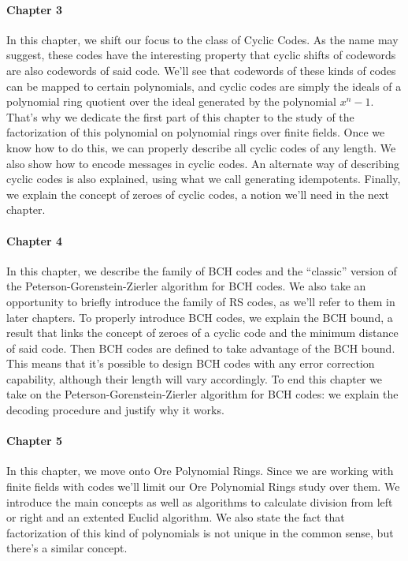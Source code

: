\paragraph{Chapter 3} In this chapter, we shift our focus to the class of Cyclic Codes. 
As the name may suggest, these codes have the interesting property that cyclic shifts of codewords are also codewords of said code.
We'll see that codewords of these kinds of codes can be mapped to certain polynomials, and cyclic codes are simply the ideals of a polynomial ring quotient over the ideal generated by the polynomial \(x^n - 1\).
That's why we dedicate the first part of this chapter to the study of the factorization of this polynomial on polynomial rings over finite fields.
Once we know how to do this, we can properly describe all cyclic codes of any length.
We also show how to encode messages in cyclic codes.
An alternate way of describing cyclic codes is also explained, using what we call generating idempotents.
Finally, we explain the concept of zeroes of cyclic codes, a notion we'll need in the next chapter.

\paragraph{Chapter 4} In this chapter, we describe the family of BCH codes and the ``classic'' version of the Peterson-Gorenstein-Zierler algorithm for BCH codes.
We also take an opportunity to briefly introduce the family of RS codes, as we'll refer to them in later chapters.
To properly introduce BCH codes, we explain the BCH bound, a result that links the concept of zeroes of a cyclic code and the minimum distance of said code.
Then BCH codes are defined to take advantage of the BCH bound.
This means that it's possible to design BCH codes with any error correction capability, although their length will vary accordingly.
To end this chapter we take on the Peterson-Gorenstein-Zierler algorithm for BCH codes: we explain the decoding procedure and justify why it works.

\paragraph{Chapter 5} In this chapter, we move onto Ore Polynomial Rings.
Since we are working with finite fields with codes we'll limit our Ore Polynomial Rings study over them.
We introduce the main concepts as well as algorithms to calculate division from left or right and an extented Euclid algorithm.
We also state the fact that factorization of this kind of polynomials is not unique in the common sense, but there's a similar concept.

